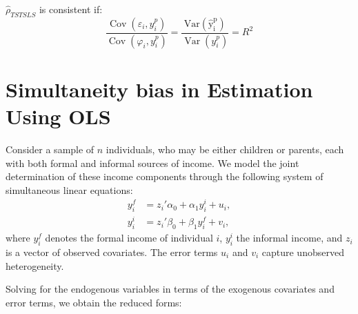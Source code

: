 \documentclass[12pt,oneside]{article}
\DeclareMathOperator*{\plim}{plim}
\theoremstyle{bracket}
\begin{document}
$\hat{\rho}_{TSTSLS}$ is consistent if:
$$\frac{\operatorname{Cov}(\varepsilon_i,\hat{y}_i^p)}{\operatorname{Cov}(\varphi_i,y_i^p)}=\frac{\operatorname{Var(\hat{y}_i^p)}}{\operatorname{Var}(y_i^p)}=R^2$$

\begin{comment}
\section{Errors in variables}
\begin{align*}
    y_i^c &= \beta y_i^p + \varepsilon_i, \\
    y_i^{p} &= \delta z_i + u_i,\\
    y_i^p &= y_i^{p_f}+y_i^{p_i} 
\end{align*}
where $\varepsilon_i = \psi_i + \varphi_i$, \textcolor{blue}{$\mathbb{E}[\varphi_i|y_i^p] \neq 0$} and \textcolor{blue}{$\mathbb{E}[\psi_i|y_i^p] = 0$}.  
Define $\rho^{Formal} = \frac{\operatorname{Cov}(y^c_i,y_i^{p_f})}{\operatorname{Var}(y_i^{p_f})}$
\begin{align*}
     \plim_{n\to \infty}\hat{\rho}^{Formal}_{OLS}  &= \frac{\operatorname{Cov}(\beta y_i^p + \psi_i + \varphi_i - y^{p_i}_i, y_i^{p_f})}{\operatorname{Var}(y_i^{p_f})}\\
     \plim_{n\to \infty}\hat{\rho}^{Formal}_{TSTSLS}  &
\end{align*}
\end{comment}
\section{Simultaneity bias in Estimation Using OLS}

Consider a sample of $n$ individuals, who may be either children or parents, each with both formal and informal sources of income. 
We model the joint determination of these income components through the following system of simultaneous linear equations:
\begin{align}
    y_i^f &= z_i' \alpha_0 + \alpha_1 y_i^i + u_i, \\
    y_i^i &= z_i' \beta_0 + \beta_1 y_i^f + v_i,
\end{align}
where $y_i^f$ denotes the formal income of individual $i$, $y_i^i$ the informal income, and $z_i$ is a vector of observed covariates. 
The error terms $u_i$ and $v_i$ capture unobserved heterogeneity.

Solving for the endogenous variables in terms of the exogenous covariates and error terms, we obtain the reduced forms:
\end{document}
